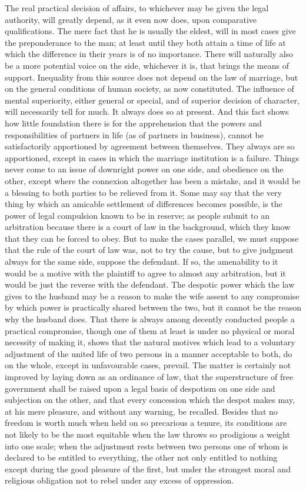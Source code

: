 \documentclass[12pt]{report}
\begin{document}
The real practical decision of affairs, to whichever may be given the legal authority, will greatly depend, as it even now does, upon comparative qualifications. The mere fact that he is usually the eldest, will in most cases give the preponderance to the man; at least until they both attain a time of life at which the difference in their years is of no importance. There will naturally also be a more potential voice on the side, whichever it is, that brings the means of support. Inequality from this source does not depend on the law of marriage, but on the general conditions of human society, as now constituted. The influence of mental superiority, either general or special, and of superior decision of character, will necessarily tell for much. It always does so at present. And this fact shows how little foundation there is for the apprehension that the powers and responsibilities of partners in life (as of partners in business), cannot be satisfactorily apportioned by agreement between themselves. They always are so apportioned, except in cases in which the marriage institution is a failure. Things never come to an issue of downright power on one side, and obedience on the other, except where the connexion altogether has been a mistake, and it would be a blessing to both parties to be relieved from it. Some may say that the very thing by which an amicable settlement of differences becomes possible, is the power of legal compulsion known to be in reserve; as people submit to an arbitration because there is a court of law in the background, which they know that they can be forced to obey. But to make the cases parallel, we must suppose that the rule of the court of law was, not to try the cause, but to give judgment always for the same side, suppose the defendant. If so, the amenability to it would be a motive with the plaintiff to agree to almost any arbitration, but it would be just the reverse with the defendant. The despotic power which the law gives to the husband may be a reason to make the wife assent to any compromise by which power is practically shared between the two, but it cannot be the reason why the husband does. That there is always among decently conducted people a practical compromise, though one of them at least is under no physical or moral necessity of making it, shows that the natural motives which lead to a voluntary adjustment of the united life of two persons in a manner acceptable to both, do on the whole, except in unfavourable cases, prevail. The matter is certainly not improved by laying down as an ordinance of law, that the superstructure of free government shall be raised upon a legal basis of despotism on one side and subjection on the other, and that every concession which the despot makes may, at his mere pleasure, and without any warning, be recalled. Besides that no freedom is worth much when held on so precarious a tenure, its conditions are not likely to be the most equitable when the law throws so prodigious a weight into one scale; when the adjustment rests between two persons one of whom is declared to be entitled to everything, the other not only entitled to nothing except during the good pleasure of the first, but under the strongest moral and religious obligation not to rebel under any excess of oppression.
\end{document}

